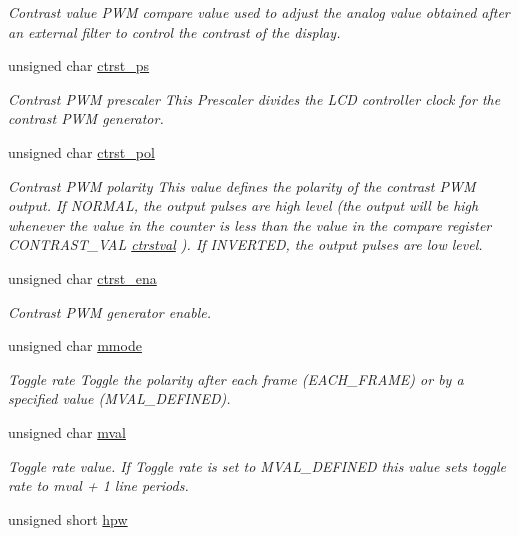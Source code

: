\begin{CompactItemize}
\begin{CompactList}\small\item\em Contrast value PWM compare value used to adjust the analog value obtained after an external filter to control the contrast of the display. \item\end{CompactList}\item 
unsigned char \hyperlink{structlcdc__configuration__s_c2eb547fd86497e3e57a46ea4e712881}{ctrst\_\-ps}
\begin{CompactList}\small\item\em Contrast PWM prescaler This Prescaler divides the LCD controller clock for the contrast PWM generator. \item\end{CompactList}\item 
unsigned char \hyperlink{structlcdc__configuration__s_4e933794a6cfe4618b226d15b04a2ea2}{ctrst\_\-pol}
\begin{CompactList}\small\item\em Contrast PWM polarity This value defines the polarity of the contrast PWM output. If NORMAL, the output pulses are high level (the output will be high whenever the value in the counter is less than the value in the compare register CONTRAST\_\-VAL \hyperlink{structlcdc__configuration__s_63e7bb2ad3e2a853d47e495a78d87d49}{ctrstval} ). If INVERTED, the output pulses are low level. \item\end{CompactList}\item 
unsigned char \hyperlink{structlcdc__configuration__s_01ba7740730856ce7d608653cf7f1eaa}{ctrst\_\-ena}
\begin{CompactList}\small\item\em Contrast PWM generator enable. \item\end{CompactList}\item 
unsigned char \hyperlink{structlcdc__configuration__s_aa3546e4cd6be09fb7e6eaf23a49543b}{mmode}
\begin{CompactList}\small\item\em Toggle rate Toggle the polarity after each frame (EACH\_\-FRAME) or by a specified value (MVAL\_\-DEFINED). \item\end{CompactList}\item 
unsigned char \hyperlink{structlcdc__configuration__s_740b398c5684557414208ae5197b01d4}{mval}
\begin{CompactList}\small\item\em Toggle rate value. If Toggle rate is set to MVAL\_\-DEFINED this value sets toggle rate to mval + 1 line periods. \item\end{CompactList}\item 
\hypertarget{structlcdc__configuration__s_07e008a5d6752719d23da6949c06acad}{
unsigned short \hyperlink{structlcdc__configuration__s_07e008a5d6752719d23da6949c06acad}{hpw}}
\label{structlcdc__configuration__s_07e008a5d6752719d23da6949c06acad}


\end{CompactItemize}
